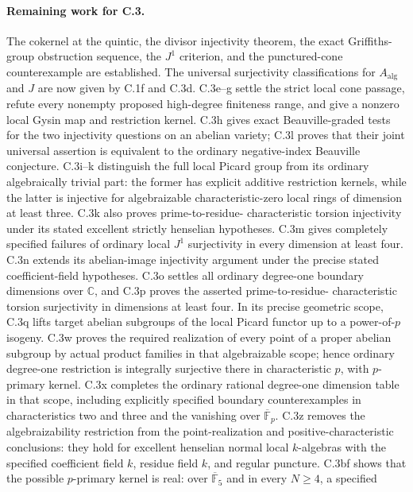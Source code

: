 \paragraph{Remaining work for C.3.}
The cokernel at the quintic, the divisor injectivity theorem, the exact
Griffiths-group obstruction sequence, the $J^1$ criterion, and the
punctured-cone counterexample are established. The universal
surjectivity classifications for $A_{\mathrm{alg}}$ and $J$ are now
given by C.1f and C.3d. C.3e--g settle the strict local cone
passage, refute every nonempty proposed high-degree finiteness
range, and give a nonzero local Gysin map and restriction kernel.
C.3h gives exact Beauville-graded tests for the two injectivity
questions on an abelian variety; C.3l proves that their joint
universal assertion is equivalent to the ordinary negative-index
Beauville conjecture. C.3i--k distinguish the full local Picard
group from its ordinary algebraically trivial part: the former
has explicit additive restriction kernels, while the latter is
injective for algebraizable characteristic-zero local rings of
dimension at least three. C.3k also proves prime-to-residue-
characteristic torsion injectivity under its stated excellent
strictly henselian hypotheses. C.3m gives completely specified
failures of ordinary local $J^1$ surjectivity in every dimension
at least four. C.3n extends its abelian-image injectivity argument
under the precise stated coefficient-field hypotheses. C.3o
settles all ordinary degree-one boundary dimensions over
$\mathbb C$, and C.3p proves the asserted prime-to-residue-
characteristic torsion surjectivity in dimensions at least four.
In its precise geometric scope, C.3q lifts target abelian
subgroups of the local Picard functor up to a power-of-$p$
isogeny. C.3w proves the required realization of every
point of a proper abelian subgroup by actual product
families in that algebraizable scope; hence ordinary
degree-one restriction is integrally surjective there
in characteristic $p$, with $p$-primary kernel.
C.3x completes the ordinary rational degree-one dimension
table in that scope, including explicitly specified boundary
counterexamples in characteristics two and three and the
vanishing over $\overline{\mathbb F}_p$. C.3z removes the
algebraizability restriction from the point-realization and
positive-characteristic conclusions: they hold for excellent
henselian normal local $k$-algebras with the specified
coefficient field $k$, residue field $k$, and regular puncture.
C.3bf shows that the possible $p$-primary kernel is real:
over $\overline{\mathbb F}_5$ and in every $N\ge4$, a specified
